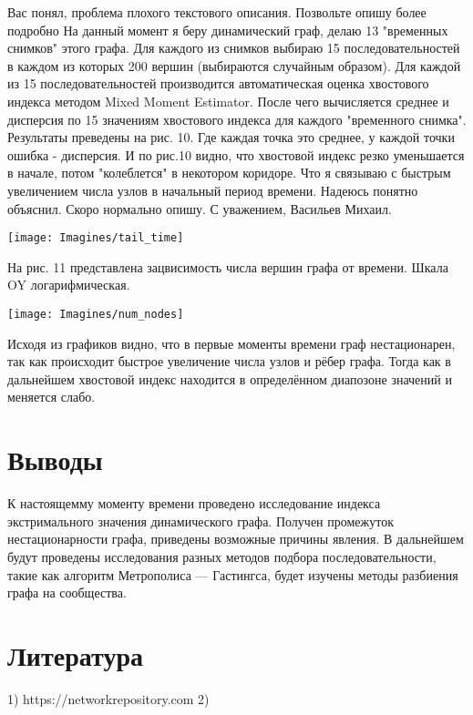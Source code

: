 \documentclass[a4paper,12pt]{article}
\begin{document}
Вас понял, проблема плохого текстового описания. Позвольте опишу более подробно
На данный момент я беру динамический граф, делаю 13 "временных снимков" этого графа. Для каждого из снимков выбираю 15 последовательностей в каждом из которых 200 вершин (выбираются случайным образом). Для каждой из 15 последовательностей производится автоматическая оценка хвостового индекса методом Mixed Moment Estimator. После чего вычисляется среднее и дисперсия по 15 значениям хвостового индекса для каждого "временного снимка". Результаты преведены на рис. 10. Где каждая точка это среднее, у каждой точки ошибка - дисперсия. И по рис.10 видно, что хвостовой индекс резко уменьшается в начале, потом "колеблется" в некотором коридоре. Что я связываю с быстрым увеличением числа узлов в начальный период времени.
Надеюсь понятно объяснил. Скоро нормально опишу.
С уважением, Васильев Михаил.
 


\begin{center}
\centering 
\texttt{[image: Imagines/tail\_time]}
\end{center}

На рис. 11 представлена зацвисимость числа вершин графа от времени. Шкала OY логарифмическая.

\begin{center}
\centering 
\texttt{[image: Imagines/num\_nodes]}
\end{center}

Исходя из графиков видно, что в первые моменты времени граф нестационарен, так как происходит быстрое увеличение числа узлов и рёбер графа. Тогда как в дальнейшем хвостовой индекс находится в определённом диапозоне значений и меняется слабо.


\section{Выводы}
К настоящемму моменту времени проведено исследование индекса экстримального значения динамического графа. Получен промежуток нестационарности графа, приведены возможные причины явления. В дальнейшем будут проведены исследования разных методов подбора последовательности, такие как алгоритм Метрополиса — Гастингса, будет изучены методы разбиения графа на сообщества.   



\section{Литература}
1) https://networkrepository.com
2) 
\end{document}
